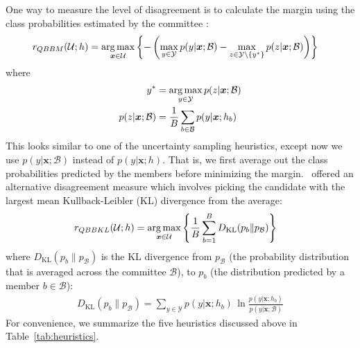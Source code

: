 \documentclass[fleqn,10pt,lineno]{wlpeerj} %
\newcommand{\B}{\mathcal{B}}
\newcommand{\Y}{\mathcal{Y}}
\newcommand{\Unlabeled}{\mathcal{U}}
\newcommand*{\argmax}{\operatornamewithlimits{arg\,max}\limits}
\begin{document}
One way to measure the level of disagreement is to calculate the margin using
the class probabilities estimated by the committee \citep{melville04}:
\begin{align}
	r_{QBBM}(\Unlabeled; h) &= \argmax_{\bm{x} \in \Unlabeled}
	\left\{ - \left( \max_{y \in \Y} p(y | \bm{x}; \B) -
	\max_{z \in \Y \setminus \{y^*\}} p(z | \bm{x}; \B) \right) \right\}
\end{align}
where
\begin{align}
	y^* &= \argmax_{y \in \Y} p(z | \bm{x}; \B) \\
	p(z | \bm{x}; \B) &= \dfrac{1}{B} \sum_{b \in \B} p(y | \bm{x}; h_b)
\end{align}
This looks similar to one of the uncertainty sampling heuristics, except now we
use $p(y | \bm{x}; \B)$ instead of $ p(y | \bm{x}; h)$. That is, we first
average out the class probabilities predicted by the members before minimizing
the margin.~\cite{mccallum98} offered an alternative disagreement measure which
involves picking the candidate with the largest mean Kullback-Leibler (KL)
divergence from the average:
\begin{align}
	r_{QBBKL}(\Unlabeled; h) &= \argmax_{\bm{x} \in \Unlabeled}
	\left\{ \dfrac{1}{B}
	\sum_{b=1}^B D_{\mathrm{KL}}(p_b\|p_\B) \right\}
\end{align}
where $D_{\mathrm{KL}}(p_b\|p_\B)$ is the KL divergence from $p_\B$ (the
probability distribution that is averaged across the committee $\B$), to $p_b$
(the distribution predicted by a member $b \in \B$):
\begin{align}
	D_{\mathrm{KL}}(p_b\|p_\B) = \sum_{y \in \Y} p(y | \bm{x}; h_b) \,
								 \ln\frac{p(y | \bm{x}; h_b)}{p(y | \bm{x}; \B)}
\end{align}
For convenience, we summarize the five heuristics discussed above in
Table~\ref{tab:heuristics}.
\end{document}
